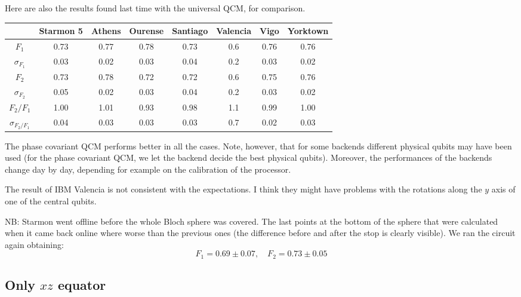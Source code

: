 \documentclass[11pt]{article}
\begin{document}
Here are also the results found last time with the universal QCM, for comparison.
\begin{table}[H]
    \centering
    \begin{tabular}{|c|c|c|c|c|c|c|c|}
    \hline
    \textbf{} & \textbf{Starmon 5} & \textbf{Athens} & \textbf{Ourense} & \textbf{Santiago} & \textbf{Valencia} & \textbf{Vigo} & \textbf{Yorktown} \\ \hline
    $F_1$              & 0.73 & 0.77 & 0.78 & 0.73 & 0.6 & 0.76 & 0.76 \\ \hline
    $\sigma_{F_1}$     & 0.03 & 0.02 & 0.03 & 0.04 & 0.2 & 0.03 & 0.02 \\ \hline
    $F_2$              & 0.73 & 0.78 & 0.72 & 0.72 & 0.6 & 0.75 & 0.76 \\ \hline
    $\sigma_{F_2}$     & 0.05 & 0.02 & 0.03 & 0.04 & 0.2 & 0.03 & 0.02 \\ \hline
    $F_2/F_1$          & 1.00 & 1.01 & 0.93 & 0.98 & 1.1 & 0.99 & 1.00 \\ \hline
    $\sigma_{F_2/F_1}$ & 0.04 & 0.03 & 0.03 & 0.03 & 0.7 & 0.02 & 0.03 \\ \hline
    \end{tabular}
\end{table}

The phase covariant QCM performs better in all the cases.
Note, however, that for some backends different physical qubits may have been used (for the phase covariant QCM, we let the backend decide the best physical qubits).
Moreover, the performances of the backends change day by day, depending for example on the calibration of the processor.

The result of IBM Valencia is not consistent with the expectations. I think they might have problems with the rotations along the $y$ axis of one of the central qubits.

NB: Starmon went offline before the whole Bloch sphere was covered. 
The last points at the bottom of the sphere that were calculated when it came back online where worse than the previous ones (the difference before and after the stop is clearly visible).
We ran the circuit again obtaining:
\[
    F_1=0.69 \pm 0.07, \quad F_2=0.73 \pm 0.05
\]


\subsection{Only $xz$ equator}
\end{document}
